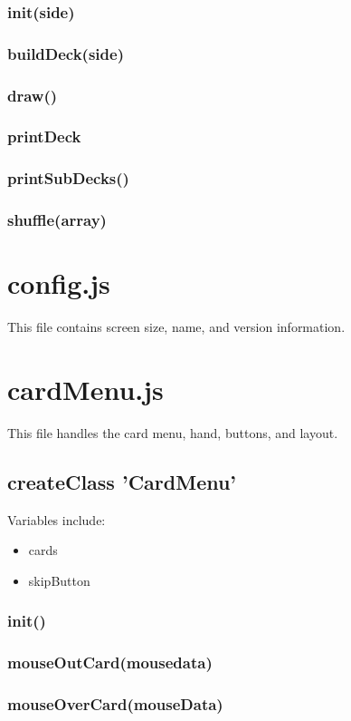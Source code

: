\documentclass[12pt]{article}
\begin{document}
\subsubsection*{init(side)}
\subsubsection*{buildDeck(side)}
\subsubsection*{draw()}
\subsubsection*{printDeck}
\subsubsection*{printSubDecks()}
\subsubsection*{shuffle(array)}
\section*{config.js}
This file contains screen size, name, and version information. 
\section*{cardMenu.js}
This file handles the card menu, hand, buttons, and layout. 
\subsection*{createClass 'CardMenu'}
Variables include:
\begin{itemize}
\item cards
\item skipButton
\end{itemize}
\subsubsection*{init()}
\subsubsection*{mouseOutCard(mousedata)}
\subsubsection*{mouseOverCard(mouseData)}
\end{document}
